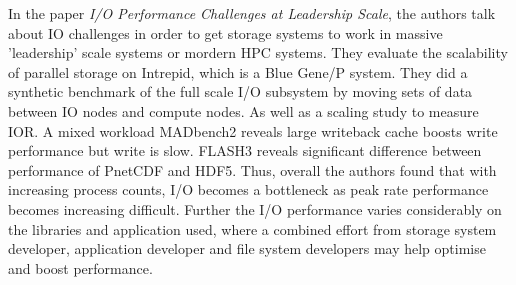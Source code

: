 \documentclass[a4paper,12 pt]{article}
\begin{document}
In the paper \textit{I/O Performance Challenges at Leadership Scale}, the authors talk about IO challenges in order to get storage systems to work in massive 'leadership' scale systems or mordern HPC systems. They evaluate the scalability of parallel storage on Intrepid, which is a Blue Gene/P system. They did a synthetic benchmark of the full scale I/O subsystem by moving sets of data between IO nodes and compute nodes. As well as a scaling study to measure IOR. A mixed workload MADbench2 reveals large writeback cache boosts write performance but write is slow. FLASH3 reveals significant difference between performance of PnetCDF and HDF5. Thus, overall the authors found that with increasing process counts, I/O becomes a bottleneck as peak rate performance becomes increasing difficult. Further the I/O performance varies considerably on the libraries and application used, where a combined effort from storage system developer, application developer and file system developers may help optimise and boost performance.
\end{document}
